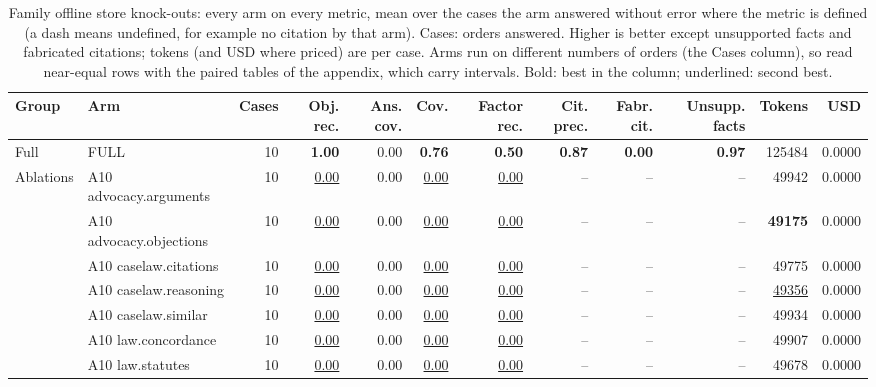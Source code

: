 \begin{table}[t]
\centering\footnotesize
\begin{adjustbox}{max width=\textwidth}
\begin{tabular}{@{}llrrrrrrrrrr@{}}
\toprule
Group & Arm & Cases & Obj. rec. & Ans. cov. & Cov. & Factor rec. & Cit. prec. & Fabr. cit. & Unsupp. facts & Tokens & USD \\
\midrule
Full & FULL & 10 & \textbf{1.00} & 0.00 & \textbf{0.76} & \textbf{0.50} & \textbf{0.87} & \textbf{0.00} & \textbf{0.97} & 125484 & 0.0000 \\
\midrule
Ablations & A10 advocacy.arguments & 10 & \underline{0.00} & 0.00 & \underline{0.00} & \underline{0.00} & -- & -- & -- & 49942 & 0.0000 \\
 & A10 advocacy.objections & 10 & \underline{0.00} & 0.00 & \underline{0.00} & \underline{0.00} & -- & -- & -- & \textbf{49175} & 0.0000 \\
 & A10 caselaw.citations & 10 & \underline{0.00} & 0.00 & \underline{0.00} & \underline{0.00} & -- & -- & -- & 49775 & 0.0000 \\
 & A10 caselaw.reasoning & 10 & \underline{0.00} & 0.00 & \underline{0.00} & \underline{0.00} & -- & -- & -- & \underline{49356} & 0.0000 \\
 & A10 caselaw.similar & 10 & \underline{0.00} & 0.00 & \underline{0.00} & \underline{0.00} & -- & -- & -- & 49934 & 0.0000 \\
 & A10 law.concordance & 10 & \underline{0.00} & 0.00 & \underline{0.00} & \underline{0.00} & -- & -- & -- & 49907 & 0.0000 \\
 & A10 law.statutes & 10 & \underline{0.00} & 0.00 & \underline{0.00} & \underline{0.00} & -- & -- & -- & 49678 & 0.0000 \\
\bottomrule
\end{tabular}
\end{adjustbox}
\caption{Family offline store knock-outs: every arm on every metric, mean over the cases the arm answered without error where the metric is defined (a dash means undefined, for example no citation by that arm). Cases: orders answered. Higher is better except unsupported facts and fabricated citations; tokens (and USD where priced) are per case. Arms run on different numbers of orders (the Cases column), so read near-equal rows with the paired tables of the appendix, which carry intervals. Bold: best in the column; underlined: second best.}
\label{tab:master_shravani_off}
\end{table}